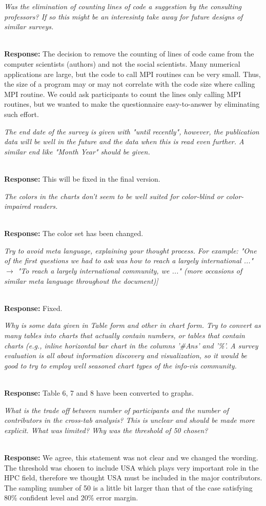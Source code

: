 \documentclass[11pt]{article}
\newcommand{\iresponse}[2]{{\item \em #1}\\%
  {\bf Response:} #2}
\begin{document}
\begin{enumerate}
\iresponse{Was the elimination of counting lines of code a suggestion
  by the consulting professors? If so this might be an interesintg
  take away for future designs of similar surveys.}
{
The decision to remove the counting of lines of code came from the
computer scientists (authors) and not the social scientists.
Many numerical applications are large, but the
code to call MPI routines can be very small. Thus, the size of a
program may or may not correlate with the code size where calling MPI
routine. We could ask participants to count the lines only calling MPI
routines, but we wanted to make the questionnaire easy-to-answer by
eliminating such effort.
}

\iresponse{The end date of the survey is given with "until recently",
  however, the publication data will be well in the future and the
  data when this is read even further. A similar end like "Month Year"
  should be given.}
{This will be fixed in the final version.}

\iresponse{The colors in the charts don't seem to be well suited for
  color-blind or color-impaired readers.}
{The color set has been changed.}

\iresponse{Try to avoid meta language, explaining your thought
  process. For example: "One of the first questions we had to ask was
  how to reach a largely international ..."  $\to$ "To reach a largely
  international community, we ..." (more occasions of similar meta
  language throughout the document)]}
{Fixed.}

\iresponse{Why is some data given in Table form and other in chart
  form. Try to convert as many tables into charts that actually
  contain numbers, or tables that contain charts (e.g., inline
  horizontal bar chart in the columns '\#Ans' and '\%'. A survey
  evaluation is all about information discovery and visualization, so
  it would be good to try to employ well seasoned chart types of the
  info-vis community.}
{Table 6, 7 and 8 have been converted to graphs.}

\iresponse{What is the trade off between number of participants and
  the number of contributors in the cross-tab analysis? This is
  unclear and should be made more explicit. What was limited? Why was
  the threshold of 50 chosen?}
{We agree, this statement was not
  clear and we changed the wording.  The threshold was chosen to
  include USA which plays very important role in the HPC field,
  therefore we thought USA must be included in the major
  contributors. The sampling number of 50 is a little bit larger than
  that of the case satisfying 80\% confident level and 20\% error
  margin.} 


\end{enumerate}
\end{document}
